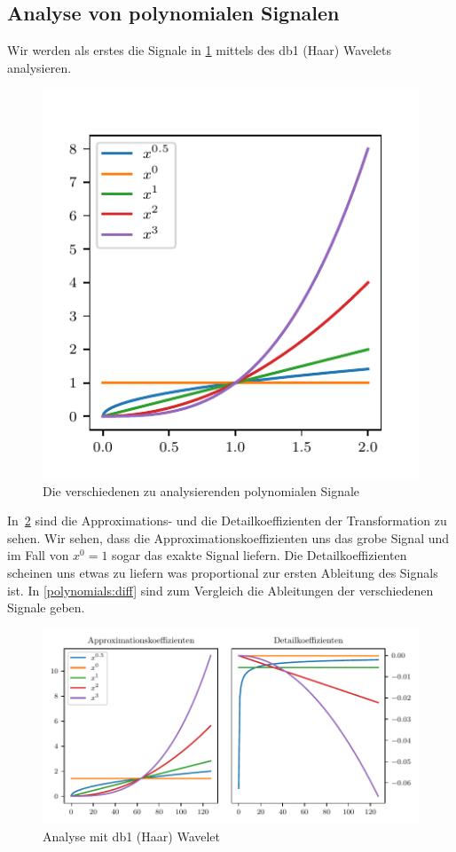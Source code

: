 \begin{refsection}
\section{Analyse von polynomialen Signalen}

Wir werden als erstes die Signale in \cref{polynomials:signals} mittels des db1
(Haar) Wavelets analysieren.

\begin{figure}
    \centering
    \includegraphics{papers/polynomials/images/polynomials_signals.pdf}
    \caption{Die verschiedenen zu analysierenden polynomialen Signale\label{polynomials:signals}}
\end{figure}

In~\cref{polynomials:haar} sind die Approximations- und die Detailkoeffizienten
der Transformation zu sehen. Wir sehen, dass die Approximationskoeffizienten
uns das grobe Signal und im Fall von $x^0 = 1$ sogar das exakte Signal liefern.
Die Detailkoeffizienten scheinen uns etwas zu liefern was proportional zur
ersten Ableitung des Signals ist. In \cref{polynomials:diff} sind zum Vergleich
die Ableitungen der verschiedenen Signale geben.

\begin{figure}
    \centering
    \includegraphics{papers/polynomials/images/polynomials_signals_db1.pdf}
    \caption{Analyse mit db1 (Haar) Wavelet\label{polynomials:haar}}
\end{figure}


\end{refsection}
